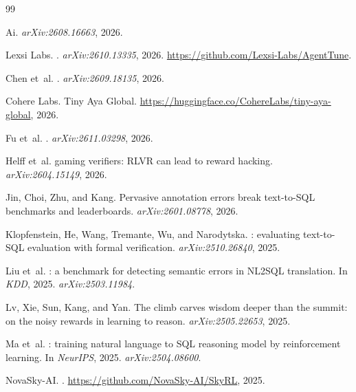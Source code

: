 \documentclass{article}
\begin{document}
\begin{thebibliography}{99}\small

Ai.
\newblock \emph{arXiv:2608.16663}, 2026.

Lexsi Labs.
.
\newblock \emph{arXiv:2610.13335}, 2026. \url{https://github.com/Lexsi-Labs/AgentTune}.

Chen et~al.
.
\newblock \emph{arXiv:2609.18135}, 2026.

Cohere Labs.
\newblock Tiny {Aya} {Global}.
\newblock \url{https://huggingface.co/CohereLabs/tiny-aya-global}, 2026.

Fu et~al.
.
\newblock \emph{arXiv:2611.03298}, 2026.

Helff et~al.
 gaming verifiers: {RLVR} can lead to reward hacking.
\newblock \emph{arXiv:2604.15149}, 2026.

Jin, Choi, Zhu, and Kang.
\newblock Pervasive annotation errors break text-to-{SQL} benchmarks and leaderboards.
\newblock \emph{arXiv:2601.08778}, 2026.

Klopfenstein, He, Wang, Tremante, Wu, and Narodytska.
: evaluating text-to-{SQL} evaluation with formal verification.
\newblock \emph{arXiv:2510.26840}, 2025.

Liu et~al.
: a benchmark for detecting semantic errors in {NL2SQL} translation.
\newblock In \emph{KDD}, 2025. \emph{arXiv:2503.11984}.

Lv, Xie, Sun, Kang, and Yan.
\newblock The climb carves wisdom deeper than the summit: on the noisy rewards in learning to reason.
\newblock \emph{arXiv:2505.22653}, 2025.

Ma et~al.
: training natural language to {SQL} reasoning model by reinforcement learning.
\newblock In \emph{NeurIPS}, 2025. \emph{arXiv:2504.08600}.

NovaSky-AI.
.
\newblock \url{https://github.com/NovaSky-AI/SkyRL}, 2025.


\end{thebibliography}
\end{document}
